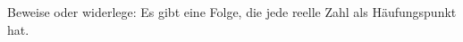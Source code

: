 \begin{prob}
  Beweise oder widerlege: Es gibt eine Folge, die jede reelle Zahl als
  Häufungspunkt hat.
\end{prob}

